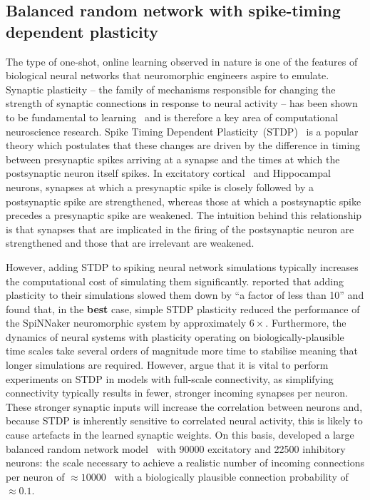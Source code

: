 \documentclass[utf8]{frontiersSCNS} %
\begin{document}
\subsection{Balanced random network with spike-timing dependent plasticity}
\label{sec:method/balanced_random}
The type of one-shot, online learning observed in nature is one of the features of biological neural networks that neuromorphic engineers aspire to emulate.
Synaptic plasticity -- the family of mechanisms responsible for changing the strength of synaptic connections in response to neural activity -- has been shown to be fundamental to learning~\citep{Nabavi2014} and is therefore a key area of computational neuroscience research.
Spike Timing Dependent Plasticity~(STDP)~\citep{Markram1997,Bi1998} is a popular theory which postulates that these changes are driven by the difference in timing between presynaptic spikes arriving at a synapse and the times at which the postsynaptic neuron itself spikes.
In excitatory cortical~\citep{Markram1997} and Hippocampal~\citep{Bi1998} neurons, synapses at which a presynaptic spike is closely followed by a postsynaptic spike are strengthened, whereas those at which a postsynaptic spike precedes a presynaptic spike are weakened.
The intuition behind this relationship is that synapses that are implicated in the firing of the postsynaptic neuron are strengthened and those that are irrelevant are weakened.

However, adding STDP to spiking neural network simulations typically increases the computational cost of simulating them significantly. 
\citet{Morrison2007} reported that adding plasticity to their simulations slowed them down by ``a factor of less than 10'' and \citet{Knight2016b} found that, in the \textbf{best} case, simple STDP plasticity reduced the performance of the SpiNNaker neuromorphic system by approximately $6\times$.
Furthermore, the dynamics of neural systems with plasticity operating on biologically-plausible time scales take several orders of magnitude more time to stabilise meaning that longer simulations are required.
However, \citeauthor{Morrison2007} argue that it is vital to perform experiments on STDP in models with full-scale connectivity, as simplifying connectivity typically results in fewer, stronger incoming synapses per neuron.
These stronger synaptic inputs will increase the correlation between neurons and, because STDP is inherently sensitive to correlated neural activity, this is likely to cause artefacts in the learned synaptic weights.
On this basis, \citeauthor{Morrison2007} developed a large balanced random network model~\citep{Brunel2000} with \num{90000} excitatory and \num{22500} inhibitory neurons: the scale necessary to achieve a realistic number of incoming connections per neuron of $\approx 10000$~\citep{braitenberg2013cortex} with a biologically plausible connection probability of $\approx 0.1$.
\end{document}
